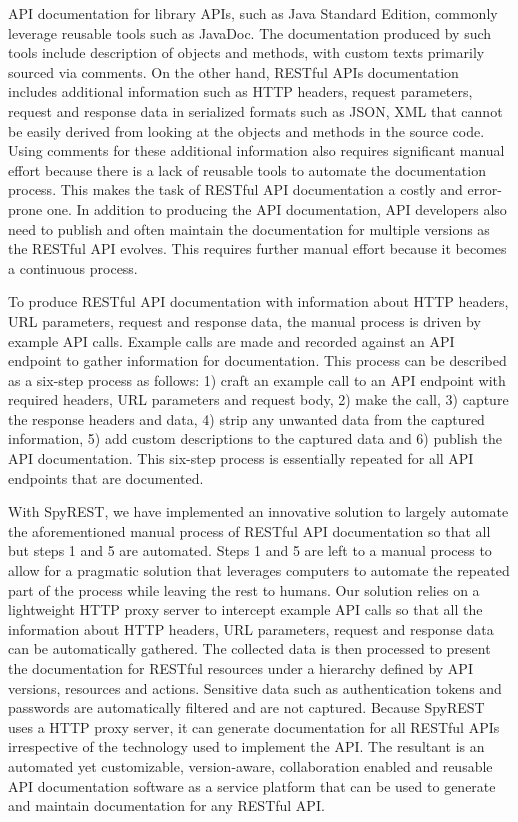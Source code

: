 \documentclass[conference]{IEEEtran}
\begin{document}
API documentation for library APIs, such as Java Standard Edition, commonly leverage reusable tools such as JavaDoc. The documentation produced by such tools include description of objects and methods, with custom texts primarily sourced via comments. On the other hand, RESTful APIs documentation includes additional information such as HTTP headers, request parameters, request and response data in serialized formats such as JSON, XML that cannot be easily derived from looking at the objects and methods in the source code. Using comments for these additional information also requires significant manual effort because there is a lack of reusable tools to automate the documentation process. This makes the task of RESTful API documentation a costly and error-prone one. In addition to producing the API documentation, API developers also need to publish and often maintain the documentation for multiple versions as the RESTful API evolves. This requires further manual effort because it becomes a continuous process.

To produce RESTful API documentation with information about HTTP headers, URL parameters, request and response data, the manual process is driven by example API calls. Example calls are made and recorded against an API endpoint to gather information for documentation. This process can be described as a six-step process as follows: 1) craft an example call to an API endpoint with required headers, URL parameters and request body, 2) make the call, 3) capture the response headers and data, 4) strip any unwanted data from the captured information, 5) add custom descriptions to the captured data and 6) publish the API documentation. This six-step process is essentially repeated for all API endpoints that are documented.

With SpyREST, we have implemented an innovative solution to largely automate the aforementioned manual process of RESTful API documentation so that all but steps 1 and 5 are automated. Steps 1 and 5 are left to a manual process to allow for a pragmatic solution that leverages computers to automate the repeated part of the process while leaving the rest to humans. Our solution relies on a lightweight HTTP proxy server to intercept example API calls so that all the information about HTTP headers, URL parameters, request and response data can be automatically gathered. The collected data is then processed to present the documentation for RESTful resources under a hierarchy defined by API versions, resources and actions. Sensitive data such as authentication tokens and passwords are automatically filtered and are not captured. Because SpyREST uses a HTTP proxy server, it can generate documentation for all RESTful APIs irrespective of the technology used to implement the API. The resultant is an automated yet customizable, version-aware, collaboration enabled and reusable API documentation software as a service platform that can be used to generate and maintain documentation for any RESTful API.
\end{document}
